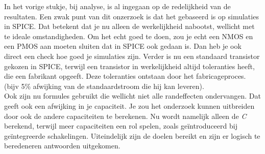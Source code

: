 
In het vorige stukje, bij analyse, is al ingegaan op de redelijkheid van de resultaten. Een zwak punt van dit onzerzoek is dat het gebaseerd is op simulaties in SPICE. Dat betekent dat je nu alleen de werkelijkheid nabootst, wellicht met te ideale omstandigheden. Om het echt goed te doen, zou je echt een NMOS en een PMOS aan moeten sluiten dat in SPICE ook gedaan is. Dan heb je ook direct een check hoe goed je simulaties zijn. Verder is nu een standaard transistor gekozen in SPICE, terwijl  een transistor in werkelijkheid altijd toleranties heeft, die een fabrikant opgeeft. Deze toleranties ontstaan door het fabricageproces. (bijv 5\% afwijking van de standaardstroom die hij kan leveren). \\
Ook zijn nu formules gebruikt die wellicht niet alle randeffecten ondervangen. Dat geeft ook een afwijking in je capaciteit. Je zou het onderzoek kunnen uitbreiden door ook de andere capaciteiten te berekenen. Nu wordt namelijk alleen de \textit{C} berekend, terwijl meer capaciteiten een rol spelen, zoals geïntroduceerd bij geïntegreerde schakelingen. Uiteindelijk zijn de doelen bereikt en zijn er logisch te beredeneren antwoorden uitgekomen. 

